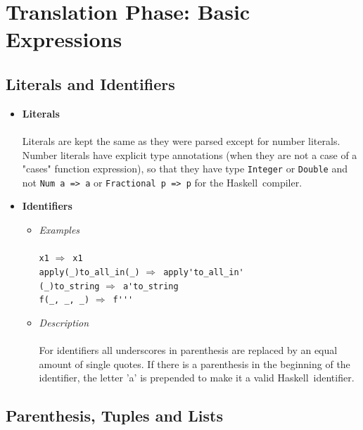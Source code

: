 \documentclass[diploma]{softlab-thesis}
\def\H{Haskell}
\def\lra{$\Longrightarrow$\ }
\begin{document}
\newpage
\section{Translation Phase: Basic Expressions}

\subsection{Literals and Identifiers}
\begin{itemize}
\item
\textbf{Literals}\\\\
Literals are kept the same as they were parsed except for number
literals. Number literals have explicit type annotations (when they are not a
case of a "cases" function expression), so that they have type \texttt{Integer}
or \texttt{Double} and not \texttt{Num a => a} or \texttt{Fractional p => p}
for the \H\ compiler.

\item
\textbf{Identifiers}

\begin{itemize}
\item
\textit{Examples}\\\\
\texttt{x1} \lra \texttt{x1} \\
\verb|apply(_)to_all_in(_)| \lra \verb|apply'to_all_in'| \\
\verb|(_)to_string| \lra \verb|a'to_string| \\
\verb|f(_, _, _)| \lra \verb|f'''|\\

\item
\textit{Description}\\\\
For identifiers all underscores in parenthesis are replaced by an equal amount
of single quotes. If there is a parenthesis in the beginning of the identifier,
the letter 'a' is prepended to make it a valid \H\ identifier.

\end{itemize}

\end{itemize}

\subsection{Parenthesis, Tuples and Lists}
\label{subsubsec:parentuplist}
\end{document}
